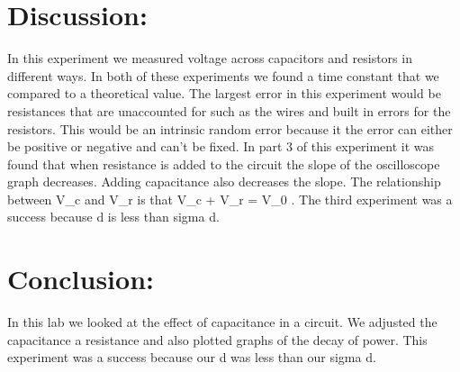 \documentclass{article}
\begin{document}
\section*{Discussion:}
\doublespace
In this experiment we measured voltage across capacitors and resistors in different ways.  In both of these experiments we found a time constant that we compared to a theoretical value.  The largest error in this experiment would be resistances that are unaccounted for such as the wires and built in errors for the resistors.  This would be an intrinsic random error because it the error can either be positive or negative and can't be fixed.  In part 3 of this experiment it was found that when resistance is added to the circuit the slope of the oscilloscope graph decreases.  Adding capacitance also decreases the slope.  The relationship between V\_c and V\_r is that V\_c + V\_r = V\_0 .  The third experiment was a success because d is less than sigma d.

  
  


\singlespace
\newpage

\section*{Conclusion:}
In this lab we looked at the effect of capacitance in a circuit.  We adjusted the capacitance a resistance and also plotted graphs of the decay of power.  This experiment was a success because our d was less than our sigma d.  
\end{document}
